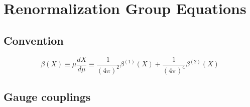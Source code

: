 \documentclass[12pt]{article}
\begin{document}
\section{Renormalization Group Equations}
\subsection{Convention}
\begin{equation*}
\beta\left(X\right) \equiv \mu \frac{d X}{d \mu}\equiv\frac{1}{\left(4 \pi\right)^{2}}\beta^{(1)}(X)+\frac{1}{\left(4 \pi\right)^{4}}\beta^{(2)}(X)
\end{equation*}


\subsection{Gauge couplings}
\end{document}
